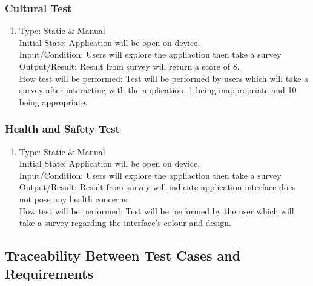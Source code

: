 \documentclass[12pt, titlepage]{article}
\begin{document}
\subsubsection{Cultural Test}

\begin{adjustwidth}{2.2em}{0pt}
\begin{enumerate}[{NF-CT}1.]
    \item Type: Static \& Manual\\
    Initial State: Application will be open on device.\\
    Input/Condition: Users will explore the appliaction then take a survey \\
    Output/Result: Result from survey will return a score of 8.\\
    How test will be performed: Test will be performed by users which will take a survey after interacting with the application, 1 being inappropriate and 10 being appropriate. 
\end{enumerate}
\end{adjustwidth}

\subsubsection{Health and Safety Test}

\begin{adjustwidth}{2.2em}{0pt}
\begin{enumerate}[{NF-HT}1.]
    \item Type: Static \& Manual\\
    Initial State: Application will be open on device.\\
    Input/Condition: Users will explore the appliaction then take a survey \\
    Output/Result: Result from survey will indicate application interface does not pose any health concerns.\\
    How test will be performed: Test will be performed by the user which will take a survey regarding the interface's colour and design.  
\end{enumerate}
\end{adjustwidth}

\subsection{Traceability Between Test Cases and Requirements}
\end{document}
